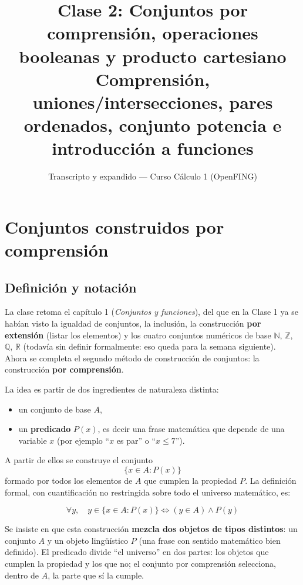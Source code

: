 \documentclass[12pt,a4paper]{article}
\title{\textbf{Clase 2: Conjuntos por comprensión, operaciones booleanas y producto cartesiano} \\[0.3em]
        \large{Comprensión, uniones/intersecciones, pares ordenados, conjunto potencia e introducción a funciones}}
\author{Transcripto y expandido --- Curso Cálculo 1 (OpenFING)}
\date{}
\begin{document}
\maketitle
\thispagestyle{empty}
\newpage

\tableofcontents
\newpage

\section{Conjuntos construidos por comprensión}

\subsection{Definición y notación}

La clase retoma el capítulo 1 (\emph{Conjuntos y funciones}), del que en la Clase 1 ya se habían visto la igualdad de conjuntos, la inclusión, la construcción \textbf{por extensión} (listar los elementos) y los cuatro conjuntos numéricos de base $\mathbb N$, $\mathbb Z$, $\mathbb Q$, $\mathbb R$ (todavía sin definir formalmente: eso queda para la semana siguiente). Ahora se completa el segundo método de construcción de conjuntos: la construcción \textbf{por comprensión}.

La idea es partir de dos ingredientes de naturaleza distinta:

\begin{itemize}
  \item un conjunto de base $A$,
  \item un \textbf{predicado} $P(x)$, es decir una frase matemática que depende de una variable $x$ (por ejemplo ``$x$ es par'' o ``$x \le 7$'').
\end{itemize}

A partir de ellos se construye el conjunto
$$\{x \in A : P(x)\}$$
formado por todos los elementos de $A$ que cumplen la propiedad $P$. La definición formal, con cuantificación no restringida sobre todo el universo matemático, es:

\begin{keybox}
$$\boxed{\forall y,\quad y \in \{x \in A : P(x)\} \iff (y \in A) \wedge P(y)}$$
\end{keybox}

Se insiste en que esta construcción \textbf{mezcla dos objetos de tipos distintos}: un conjunto $A$ y un objeto lingüístico $P$ (una frase con sentido matemático bien definido). El predicado divide ``el universo'' en dos partes: los objetos que cumplen la propiedad y los que no; el conjunto por comprensión selecciona, dentro de $A$, la parte que sí la cumple.
\end{document}
